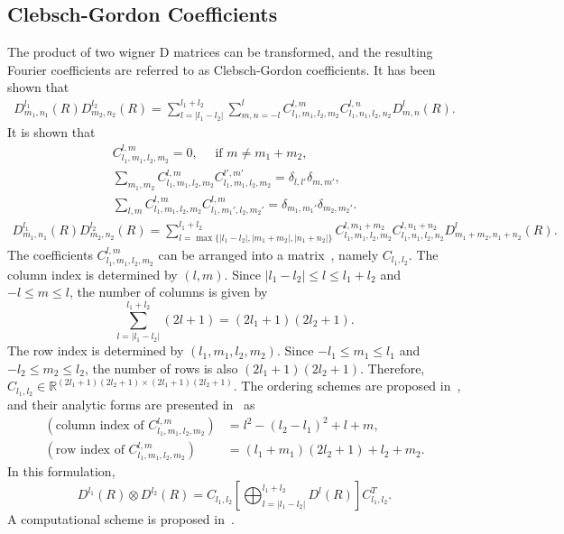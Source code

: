 \documentclass[onecolumn,11pt]{IEEEtran}
\newcommand{\bracket}[1]{\ensuremath{\left[ #1 \right]}}
\renewcommand{\Re}{\ensuremath{\mathbb{R}}}
\begin{document}
\subsection{Clebsch-Gordon Coefficients}

The product of two wigner D matrices can be transformed, and the resulting Fourier coefficients are referred to as Clebsch-Gordon coefficients. 
It has been shown that
\begin{align}
    D^{l_1}_{m_1,n_1} (R) D^{l_2}_{m_2,n_2}(R) = \sum_{l=|l_1-l_2|}^{l_1+l_2} \sum_{m,n=-l}^l C^{l,m}_{l_1,m_1,l_2,m_2} C^{l,n}_{l_1,n_1,l_2,n_2} D^{l}_{m,n}(R).
\end{align}
It is shown that
\begin{gather*}
    C^{l,m}_{l_1,m_1,l_2,m_2} = 0,\quad \text{ if } m \neq m_1 + m_2,\\
    \sum_{m_1,m_2} C^{l,m}_{l_1,m_1,l_2,m_2} C^{l',m'}_{l_1,m_1,l_2,m_2} = \delta_{l,l'}\delta_{m,m'},\\
    \sum_{l,m} C^{l,m}_{l_1,m_1,l_2,m_2} C^{l,m}_{l_1,m_1',l_2,m_2'} = \delta_{m_1,m_1'}\delta_{m_2,m_2'}.
\end{gather*}
\begin{align}
    D^{l_1}_{m_1,n_1} (R) D^{l_2}_{m_2,n_2}(R) = \sum_{l=\max\{|l_1-l_2|,|m_1+m_2|,|n_1+n_2|\}}^{l_1+l_2} C^{l,m_1+m_2}_{l_1,m_1,l_2,m_2} C^{l,n_1+n_2}_{l_1,n_1,l_2,n_2} D^{l}_{m_1+m_2,n_1+n_2}(R).
\end{align}
The coefficients $C^{l,m}_{l_1,m_1,l_2,m_2}$ can be arranged into a matrix~\cite{MarPec11}, namely $C_{l_1,l_2}$. 
The column index is determined by $(l,m)$. 
Since $|l_1-l_2|\leq l \leq l_1+l_2$ and $-l\leq m \leq l$, the number of columns is given by
\[
    \sum_{l=|l_1-l_2|}^{l_1+l_2} (2l+1) = (2l_1+1)(2l_2+1).
\]
The row index is determined by $(l_1,m_1,l_2,m_2)$. 
Since $-l_1\leq m_1 \leq l_1$ and $-l_2\leq m_2\leq l_2$, the number of rows is also $(2l_1+1)(2l_2+1)$. 
Therefore, $C_{l_1,l_2} \in \Re^{(2l_1+1)(2l_2+1)\times(2l_1+1)(2l_2+1)}$.
The ordering schemes are proposed in~\cite{MarPec11}, and their analytic forms are presented in~\cite{Dif17} as
\begin{align*}
    (\text{column index of } C^{l,m}_{l_1,m_1,l_2,m_2}) &= l^2-(l_2-l_1)^2 + l + m,\\
    (\text{row index of } C^{l,m}_{l_1,m_1,l_2,m_2}) &= (l_1+m_1)(2l_2+1) + l_2+m_2.
\end{align*}
In this formulation, 
\begin{equation}
    D^{l_1}(R) \otimes D^{l_2}(R) = C_{l_1,l_2} \bracket{ \bigoplus_{l=|l_1-l_2|}^{l_1+l_2} D^l(R)} C_{l_1,l_2}^T.\label{eqn:Clebsch_Gordon}
\end{equation}
A computational scheme is proposed in~\cite{Str14}. 
\end{document}
